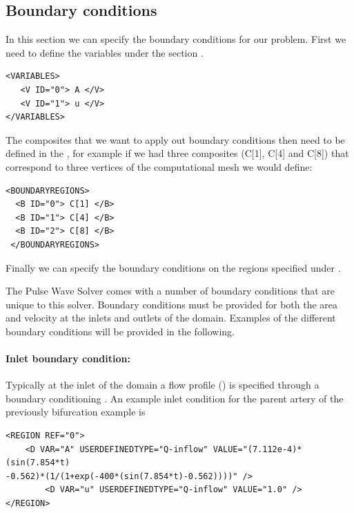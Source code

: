 \subsection{Boundary conditions}
In this section we can specify the boundary conditions for our problem.
First we need to define the variables under the section .
\begin{lstlisting}[style=XmlStyle]        
<VARIABLES>
   <V ID="0"> A </V>
   <V ID="1"> u </V>
</VARIABLES>
\end{lstlisting}

The composites that we want to apply out boundary conditions then need to be defined in the , for example if we had three composites (C[1], C[4] and C[8]) that correspond to three vertices of the computational mesh we would define:
\begin{lstlisting}[style=XmlStyle]        
<BOUNDARYREGIONS>
  <B ID="0"> C[1] </B>
  <B ID="1"> C[4] </B>
  <B ID="2"> C[8] </B>
 </BOUNDARYREGIONS>
\end{lstlisting}

Finally we can specify the boundary conditions on the regions specified under .

The Pulse Wave Solver comes with a number of boundary conditions that are unique to this solver. Boundary conditions must be provided for both the area and velocity at the inlets and outlets of the domain. Examples of the different boundary conditions will be provided in the following.

\paragraph{Inlet boundary condition:~} Typically at the inlet of the domain a flow profile () is specified through a  boundary conditioning . An example inlet condition for the parent artery of the previously bifurcation example is
\begin{lstlisting}[style=XmlStyle]
<REGION REF="0">
	<D VAR="A" USERDEFINEDTYPE="Q-inflow" VALUE="(7.112e-4)*(sin(7.854*t) 
-0.562)*(1/(1+exp(-400*(sin(7.854*t)-0.562))))" />
        <D VAR="u" USERDEFINEDTYPE="Q-inflow" VALUE="1.0" />
</REGION>
\end{lstlisting}

